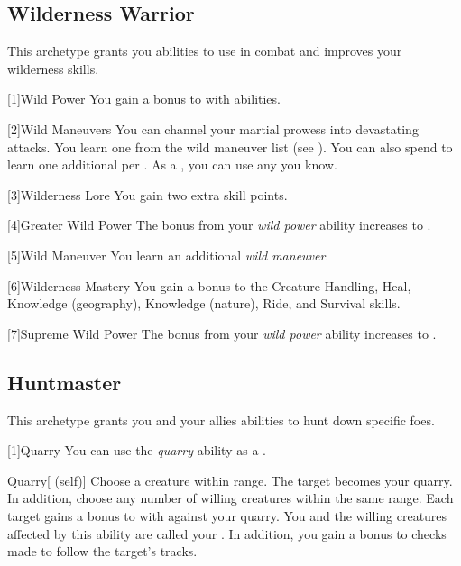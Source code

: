     \subsection{Wilderness Warrior}
        This archetype grants you abilities to use in combat and improves your wilderness skills.

        [1]{Wild Power} You gain a  bonus to  with  abilities.

        [2]{Wild Maneuvers} 
        You can channel your martial prowess into devastating attacks.
        You learn one  from the wild maneuver list (see ).
        You can also spend  to learn one additional  per .
        As a , you can use any  you know.

        [3]{Wilderness Lore} You gain two extra skill points.

        [4]{Greater Wild Power} The bonus from your \textit{wild power} ability increases to .

        [5]{Wild Maneuver}
        You learn an additional \textit{wild maneuver}.

        [6]{Wilderness Mastery} You gain a  bonus to the Creature Handling, Heal, Knowledge (geography), Knowledge (nature), Ride, and Survival skills.

        [7]{Supreme Wild Power} The bonus from your \textit{wild power} ability increases to .

    \subsection{Huntmaster}
        This archetype grants you and your allies abilities to hunt down specific foes.

        [1]{Quarry}\label{Quarry} You can use the \textit{quarry} ability as a .
        \begin{attuneability}{Quarry}[ (self)]
            Choose a creature within \rnglong range.
            The target becomes your quarry.
            In addition, choose any number of willing creatures within the same range.
            Each target gains a  bonus to  with  against your quarry.
            You and the willing creatures affected by this ability are called your .
            In addition, you gain a  bonus to checks made to follow the target's tracks.
        \end{attuneability}

